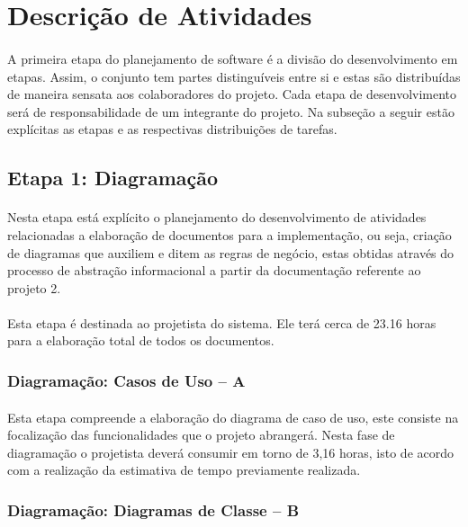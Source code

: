 \documentclass[12pt,a4paper]{article}
\begin{document}
		\section{Descrição de Atividades}
		\paragraph{} A primeira etapa do planejamento de software é a divisão do desenvolvimento em etapas. Assim, o conjunto tem partes distinguíveis entre si e estas são distribuídas de maneira sensata aos colaboradores do projeto. Cada etapa de desenvolvimento será de responsabilidade de um integrante do projeto. Na subseção a seguir estão explícitas as etapas e as respectivas distribuições de tarefas.
		\subsection{Etapa 1: Diagramação}
		\paragraph{}Nesta etapa está explícito o planejamento do desenvolvimento de atividades relacionadas a elaboração de documentos para a implementação, ou seja, criação de diagramas que auxiliem e ditem as regras de negócio, estas obtidas através do processo de abstração informacional a partir da documentação referente ao projeto 2.
		\paragraph{} Esta etapa é destinada ao projetista do sistema. Ele terá cerca de 23.16 horas para a elaboração total  de todos os documentos. 
		\subsubsection{Diagramação: Casos de Uso -- A}
		\paragraph{}Esta etapa compreende a elaboração do diagrama de caso de uso, este consiste  na focalização das funcionalidades que o projeto abrangerá. Nesta fase de diagramação o projetista deverá consumir em torno de 3,16 horas, isto de acordo com a realização da estimativa de tempo previamente realizada.
		\subsubsection{Diagramação: Diagramas de Classe -- B}
\end{document}
